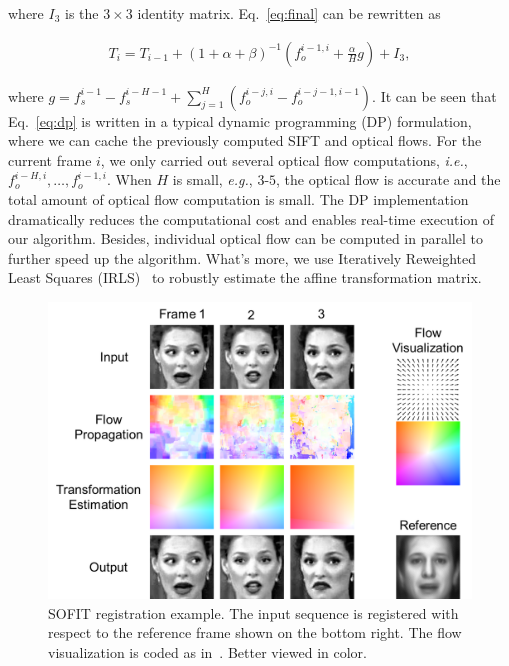 \documentclass[10pt,journal]{IEEEtran}
\begin{document}
\noindent where $I_3$ is the $3\times 3$ identity matrix. Eq.~\eqref{eq:final} can be rewritten as

\begin{align}
\label{eq:dp}
T_i=T_{i-1}+(1+\alpha+\beta)^{-1}(f_o^{i-1,i}+\frac{\alpha}{H}g) + I_3,
\end{align}

\noindent where $g=f_s^{i-1}-f_s^{i-H-1}+\sum_{j=1}^H(f_o^{i-j,i}-f_o^{i-j-1,i-1})$. It can be seen that Eq.~\eqref{eq:dp} is written in a typical dynamic programming (DP) formulation, where we can cache the previously computed SIFT and optical flows. For the current frame $i$, we only carried out several optical flow computations, \textit{i.e.}, $f_o^{i-H,i},\ldots,f_o^{i-1,i}$. When $H$ is small, \textit{e.g.}, $3$-$5$, the optical flow is accurate and the total amount of optical flow computation is small. The DP implementation dramatically reduces the computational cost and enables real-time execution of our algorithm. Besides, individual optical flow can be computed in parallel to further speed up the algorithm. What's more, we use Iteratively Reweighted Least Squares (IRLS)~\cite{Huber81} to robustly estimate the affine transformation matrix. 

\begin{figure}[htbp]
	\centering
		\includegraphics[width=\columnwidth]{fig/theory_example.png}
	\caption{SOFIT registration example. The input sequence is registered with respect to the reference frame shown on the bottom right. The flow visualization is coded as in~\cite{Baker_ICCV07}. Better viewed in color.}
	\label{fig_theory_example}
\end{figure}
\end{document}
